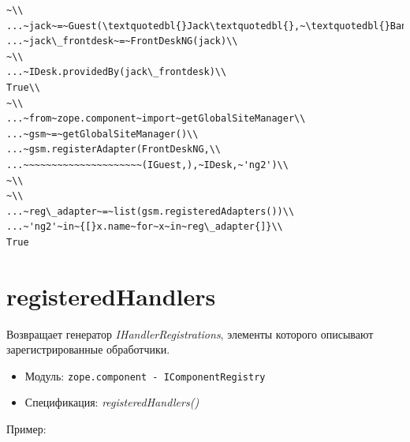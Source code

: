 \documentclass[a4paper,openany,twoside,draft]{book}
\providecommand*{\DUroletitlereference}[1]{\textsl{#1}}
\begin{document}
\begin{verbatim}
~\\
...~jack~=~Guest(\textquotedbl{}Jack\textquotedbl{},~\textquotedbl{}Bangalore\textquotedbl{})\\
...~jack\_frontdesk~=~FrontDeskNG(jack)\\
~\\
...~IDesk.providedBy(jack\_frontdesk)\\
True\\
~\\
...~from~zope.component~import~getGlobalSiteManager\\
...~gsm~=~getGlobalSiteManager()\\
...~gsm.registerAdapter(FrontDeskNG,\\
...~~~~~~~~~~~~~~~~~~~~~(IGuest,),~IDesk,~'ng2')\\
~\\
~\\
...~reg\_adapter~=~list(gsm.registeredAdapters())\\
...~'ng2'~in~{[}x.name~for~x~in~reg\_adapter{]}\\
True
\end{verbatim}


\section*{registeredHandlers%
  \label{registeredhandlers}%
}

Возвращает генератор \DUroletitlereference{IHandlerRegistrations}, элементы которого
описывают зарегистрированные обработчики.

\begin{itemize}

\item Модуль: \texttt{zope.component - IComponentRegistry}

\item Спецификация: \DUroletitlereference{registeredHandlers()}

\end{itemize}

Пример:
\end{document}
